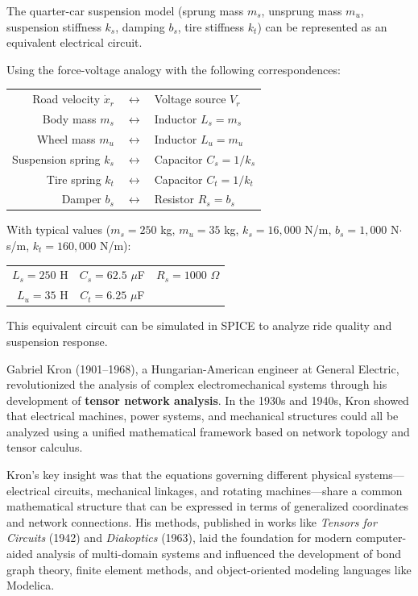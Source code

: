 \begin{examplebox}[title=Example 5.3: Quarter-Car Electrical Equivalent]
The quarter-car suspension model (sprung mass $m_s$, unsprung mass $m_u$, suspension stiffness $k_s$, damping $b_s$, tire stiffness $k_t$) can be represented as an equivalent electrical circuit.

Using the force-voltage analogy with the following correspondences:
\begin{center}
\begin{tabular}{rcl}
Road velocity $\dot{x}_r$ & $\longleftrightarrow$ & Voltage source $V_r$ \\
Body mass $m_s$ & $\longleftrightarrow$ & Inductor $L_s = m_s$ \\
Wheel mass $m_u$ & $\longleftrightarrow$ & Inductor $L_u = m_u$ \\
Suspension spring $k_s$ & $\longleftrightarrow$ & Capacitor $C_s = 1/k_s$ \\
Tire spring $k_t$ & $\longleftrightarrow$ & Capacitor $C_t = 1/k_t$ \\
Damper $b_s$ & $\longleftrightarrow$ & Resistor $R_s = b_s$
\end{tabular}
\end{center}

With typical values ($m_s = 250$ kg, $m_u = 35$ kg, $k_s = 16{,}000$ N/m, $b_s = 1{,}000$ N$\cdot$s/m, $k_t = 160{,}000$ N/m):
\begin{center}
\begin{tabular}{rcl}
$L_s = 250$ H & $C_s = 62.5$ $\mu$F & $R_s = 1000$ $\Omega$ \\
$L_u = 35$ H & $C_t = 6.25$ $\mu$F &
\end{tabular}
\end{center}

This equivalent circuit can be simulated in SPICE to analyze ride quality and suspension response.
\end{examplebox}

\begin{historicalbox}[title=Gabriel Kron and Unified Network Theory]
Gabriel Kron (1901--1968), a Hungarian-American engineer at General Electric, revolutionized the analysis of complex electromechanical systems through his development of \textbf{tensor network analysis}. In the 1930s and 1940s, Kron showed that electrical machines, power systems, and mechanical structures could all be analyzed using a unified mathematical framework based on network topology and tensor calculus.

Kron's key insight was that the equations governing different physical systems---electrical circuits, mechanical linkages, and rotating machines---share a common mathematical structure that can be expressed in terms of generalized coordinates and network connections. His methods, published in works like \emph{Tensors for Circuits} (1942) and \emph{Diakoptics} (1963), laid the foundation for modern computer-aided analysis of multi-domain systems and influenced the development of bond graph theory, finite element methods, and object-oriented modeling languages like Modelica.
\end{historicalbox}

